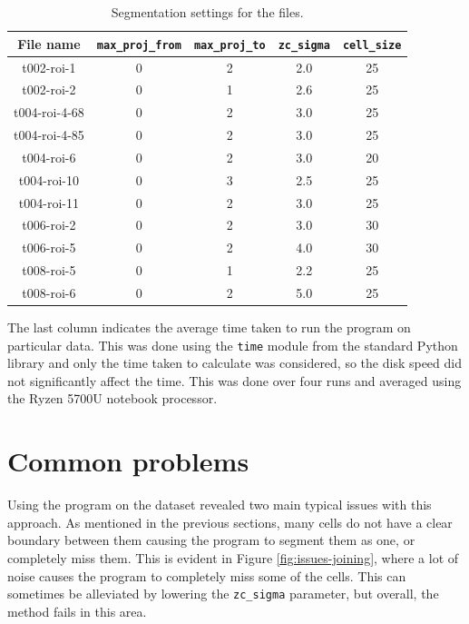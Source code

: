 \documentclass[
  digital,     %
  oneside,     %
  nosansbold,  %
  nocolorbold, %
  lof,         %
  lot,         %
]{fithesis4}
\begin{document}
\begin{table}
    \hspace*{-0.5cm}\begin{tabular}{|| c|c|c|c|c ||}
        \toprule
        File name & \texttt{max\_proj\_from} & \texttt{max\_proj\_to}& \texttt{zc\_sigma} & \texttt{cell\_size}\\
        \midrule
        t002-roi-1   &0&2&2.0&25\\
        t002-roi-2   &0&1&2.6&25\\
        t004-roi-4-68&0&2&3.0&25\\
        t004-roi-4-85&0&2&3.0&25\\
        t004-roi-6   &0&2&3.0&20\\
        t004-roi-10  &0&3&2.5&25\\
        t004-roi-11  &0&2&3.0&25\\
        t006-roi-2   &0&2&3.0&30\\
        t006-roi-5   &0&2&4.0&30\\
        t008-roi-5   &0&1&2.2&25\\
        t008-roi-6   &0&2&5.0&25\\
        \bottomrule
    \end{tabular}
    \caption{Segmentation settings for the files.}
    \label{table:configurations}
\end{table}

The last column indicates the average time taken to run the program on
particular data. This was done using the \texttt{time} module from the standard
Python library and only the time taken to calculate was considered,
so the disk speed did not significantly affect the time. This was done over
four runs and averaged using the Ryzen 5700U notebook processor.

\section{Common problems}

Using the program on the dataset revealed two main typical issues with this
approach. As mentioned in the previous sections, many cells do not have a clear boundary
between them causing the program to segment them as one, or completely miss them.
This is evident in Figure \ref{fig:issues-joining}, where a lot of noise
causes the program to completely miss some of the cells. This can sometimes be
alleviated by lowering the \texttt{zc\_sigma} parameter, but overall, the method
fails in this area.
\end{document}
